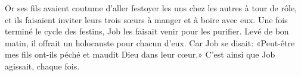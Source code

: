 Or ses fils avaient coutume d’aller festoyer les uns chez les autres à tour de rôle,
	et ils faisaient inviter leurs trois sœurs à manger et à boire avec eux.
Une fois terminé le cycle des festins, Job les faisait venir pour les purifier.
Levé de bon matin, il offrait un holocauste pour chacun d’eux.
	Car Job se disait: «Peut-être mes fils ont-ils péché et maudit Dieu dans leur cœur.»
C’est ainsi que Job agissait, chaque fois.
